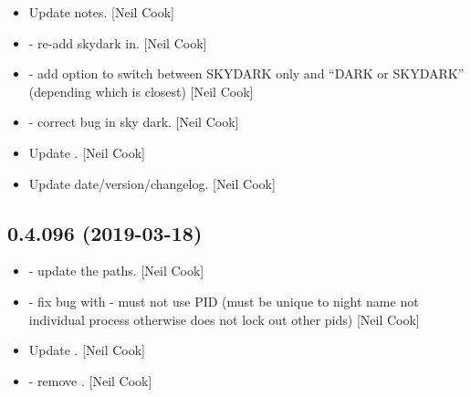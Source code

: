 \documentclass[a4paper,10pt,english]{report}
\begin{document}
\begin{itemize}
\begin{description}
\end{description}

\item {} 
Update notes. {[}Neil Cook{]}

\item {} 
 - re-add skydark in. {[}Neil Cook{]}

\item {} 
 - add option to switch between SKYDARK only
and “DARK or SKYDARK” (depending which is closest) {[}Neil Cook{]}

\item {} 
 - correct bug in sky dark. {[}Neil Cook{]}

\item {} 
Update . {[}Neil Cook{]}

\item {} 
Update date/version/changelog. {[}Neil Cook{]}

\end{itemize}


\subsection{0.4.096 (2019-03-18)}
\label{\detokenize{misc/changelog:id164}}\begin{itemize}
\item {} 
 - update the paths. {[}Neil Cook{]}

\item {} 
 - fix bug with  - must not use PID
(must be unique to night name not individual process otherwise does
not lock out other pids) {[}Neil Cook{]}

\item {} 
Update . {[}Neil Cook{]}

\item {} 
 - remove . {[}Neil Cook{]}

\end{itemize}
\end{document}
